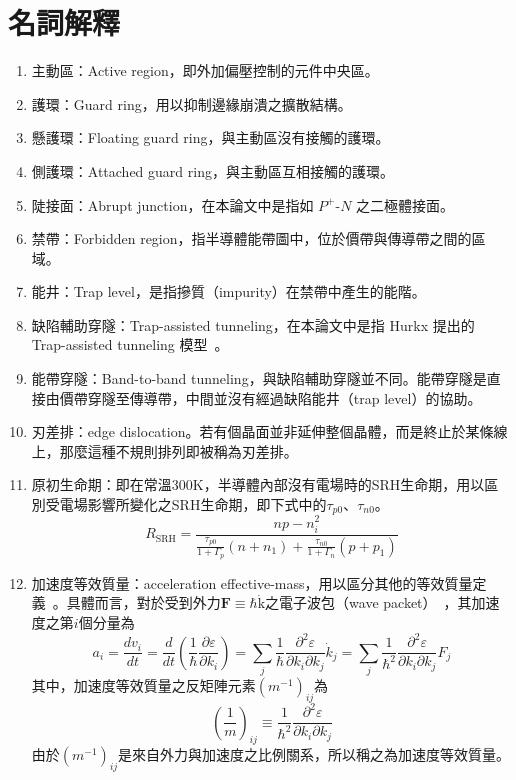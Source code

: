 \section{名詞解釋}
\begin{enumerate}
	\item 主動區：Active region，即外加偏壓控制的元件中央區。
	\item 護環：Guard ring，用以抑制邊緣崩潰之擴散結構。
	\item 懸護環：Floating guard ring，與主動區沒有接觸的護環。
	\item 側護環：Attached guard ring，與主動區互相接觸的護環。
	\item 陡接面：Abrupt junction，在本論文中是指如 $P^+$-$N$ 之二極體接面。
	\item 禁帶：Forbidden region，指半導體能帶圖中，位於價帶與傳導帶之間的區域。
	\item 能井：Trap level，是指摻質（impurity）在禁帶中產生的能階。
	\item 缺陷輔助穿隧：Trap-assisted tunneling，在本論文中是指 Hurkx 提出的 Trap-assisted tunneling 模型~\cite{hurkx1989modelling}。
	\item 能帶穿隧：Band-to-band tunneling，與缺陷輔助穿隧並不同。能帶穿隧是直接由價帶穿隧至傳導帶，中間並沒有經過缺陷能井（trap level）的協助。
	\item 刃差排：edge dislocation。若有個晶面並非延伸整個晶體，而是終止於某條線上，那麼這種不規則排列即被稱為刃差排。
	\item 原初生命期：即在常溫$300\left.\mathrm{K}\right.$，半導體內部沒有電場時的SRH生命期，用以區別受電場影響所變化之SRH生命期，即下式中的$\tau_{p0}$、$\tau_{n0}$。
	\begin{equation}
	R_\text{SRH}=\frac{np-n_i^2}{\frac{\tau_{p0}}{1+\Gamma_p}(n+n_1)+\frac{\tau_{n0}}{1+\Gamma_n}(p+p_1)}
	\end{equation}
	\item 加速度等效質量：acceleration effective-mass，用以區分其他的等效質量定義~\cite{jacoboni2012monte}。具體而言，對於受到外力$\mathbf{F}\equiv\hbar\dot{\mathrm{k}}$之電子波包（wave packet）~\cite{AshcroftMermin1976ch12}，其加速度之第$i$個分量為
\begin{equation}
a_i=\frac{dv_i}{dt}=\frac{d}{dt}\left(\frac{1}{\hbar}\frac{\partial \varepsilon}{\partial k_i}\right)=\sum_j\frac{1}{\hbar}\frac{\partial^2\varepsilon}{\partial k_i\partial k_j}\dot{k}_j=\sum_j\frac{1}{\hbar^2}\frac{\partial^2\varepsilon}{\partial k_i\partial k_j}F_j\label{eq:acceleration}
\end{equation}
其中，加速度等效質量之反矩陣元素$(m^{-1})_{ij}$為
\begin{equation}
\left(\frac{1}{m}\right)_{ij}\equiv \frac{1}{\hbar^2}\frac{\partial^2\varepsilon}{\partial k_i\partial k_j}\label{eq:inverse-of-effective-mass}
\end{equation}
由於$(m^{-1})_{ij}$是來自外力與加速度之比例關系，所以稱之為加速度等效質量。
\end{enumerate}